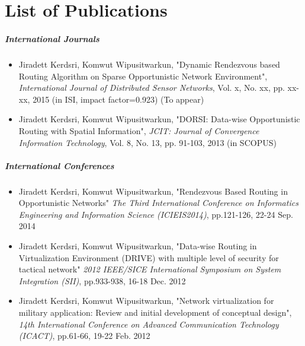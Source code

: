 \chapter{List of Publications}
\label{app1}


\paragraph{International Journals}

\begin{itemize}
\item Jiradett Kerdsri, Komwut Wipusitwarkun, "Dynamic Rendezvous based Routing Algorithm on Sparse Opportunistic Network Environment", \textit{International Journal of Distributed Sensor Networks}, Vol. x, No. xx, pp. xx-xx, 2015 (in ISI, impact factor=0.923)
(To appear)
  \item Jiradett Kerdsri, Komwut Wipusitwarkun, "DORSI: Data-wise Opportunistic Routing with Spatial Information", \textit{JCIT: Journal of Convergence Information Technology}, Vol. 8, No. 13, pp. 91-103, 2013 (in SCOPUS)
\end{itemize}


\paragraph{International Conferences}

\begin{itemize}
\item Jiradett Kerdsri, Komwut Wipusitwarkun, "Rendezvous Based Routing in Opportunistic Networks" \textit{The Third International Conference on Informatics Engineering and Information Science (ICIEIS2014)}, pp.121-126, 22-24 Sep. 2014
\item Jiradett Kerdsri, Komwut Wipusitwarkun, "Data-wise Routing in Virtualization Environment (DRIVE) with multiple level of security for tactical network" \textit{2012 IEEE/SICE International Symposium on System Integration (SII)}, pp.933-938, 16-18 Dec. 2012
\item Jiradett Kerdsri, Komwut Wipusitwarkun, "Network virtualization for military application: Review and initial development of conceptual design", \textit{14th International Conference on Advanced Communication Technology (ICACT)}, pp.61-66, 19-22 Feb. 2012  
\end{itemize}